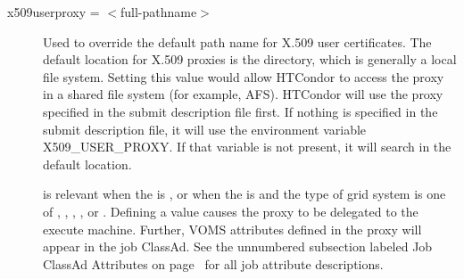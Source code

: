 \begin{description}

\label{condor-submit-x509userproxy}
\item[x509userproxy = $<$full-pathname$>$] Used to override the default
path name for X.509 user certificates. The default location for X.509 proxies
is the  directory,
which is generally a local file system.
Setting
this value would allow HTCondor to access the proxy in a shared file system
(for example, AFS).
HTCondor will use the proxy specified in the submit description file first.
If nothing is specified in the submit description file,
it will use the environment variable X509\_USER\_PROXY.
If that variable is not present,
it will search in the default location.

 is relevant when
the  is ,
or when the  is 
and the type of grid system is one of ,
, , , 
or .
Defining a value causes the proxy to be delegated to the execute machine.
Further, VOMS attributes defined in the proxy will appear in
the job ClassAd.
See the unnumbered subsection labeled Job ClassAd Attributes
on page~\pageref{sec:Job-ClassAd-Attributes} for all job attribute descriptions.

\end{description} 


